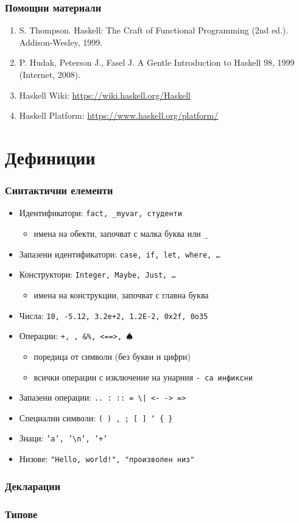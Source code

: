 \documentclass{beamer}
\begin{document}
\begin{frame}
  \frametitle{Помощни материали}
  \begin{enumerate}
  \item S. Thompson. Haskell: The Craft of Functional Programming (2nd ed.). Addison-Wesley, 1999.
  \item P. Hudak, Peterson J., Fasel J. A Gentle Introduction to Haskell 98, 1999 (Internet, 2008).
  \item Haskell Wiki: \url{https://wiki.haskell.org/Haskell}
  \item Haskell Platform: \url{https://www.haskell.org/platform/}
  \end{enumerate}
\end{frame}

\section{Дефиниции}

\begin{frame}
  \frametitle{Синтактични елементи}
  \begin{itemize}
  \item Идентификатори: \tt{fact}, \tt{\_myvar}, \tt{студенти}
    \begin{itemize}
    \item имена на обекти, започват с малка буква или \tt\_
    \end{itemize}
  \item Запазени идентификатори: \tt{case}, \tt{if}, \tt{let}, \tt{where}, \ldots
  \item Конструктори: \tt{Integer}, \tt{Maybe}, \tt{Just}, \ldots
    \begin{itemize}
    \item имена на конструкции, започват с главна буква
    \end{itemize}
  \item Числа: \tt{10}, \tt{-5.12}, \tt{3.2e+2}, \tt{1.2E-2}, \tt{0x2f}, \tt{0o35} 
  \item Операции: \tt+, \tt*, \tt{\&\%}, \tt{<==>}, \tt{$\spadesuit$}
    \begin{itemize}
    \item поредица от символи (без букви и цифри)
    \item всички операции с изключение на унарния \tt- са инфиксни
    \end{itemize}
  \item Запазени операции: \tt{..} \tt: \tt{::} \tt= \tt\textbackslash \tt| \tt{<-} \tt{->} \tt@ \tt\~ \tt{=>}
  \item Специални символи: \tt( \tt) \tt, \tt; \tt[ \tt] \tt` \tt\{ \tt\}
  \item Знаци: \tt{'a'}, \tt{'\textbackslash n'}, \tt{'+'}
  \item Низове: \tt{"Hello, world!"}, \tt{"произволен низ"}
  \end{itemize}
\end{frame}

\begin{frame}
  \frametitle{Декларации}
  
\end{frame}

\begin{frame}
  \frametitle{Типове}
  
\end{frame}
\end{document}
